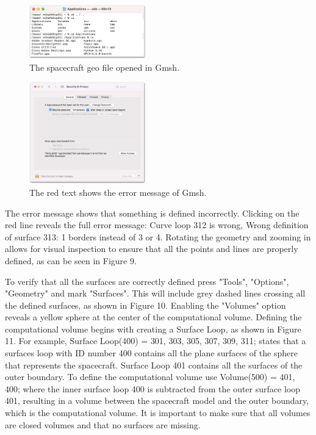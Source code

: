 \documentclass[a4paper, 11pt]{article}
\begin{document}
\begin{figure}[!ht]
    \centering
    \includegraphics[width=0.45\textwidth]{fig7.jpg}
    \caption{The spacecraft geo file opened in Gmsh.}
\end{figure}

\begin{figure}[!ht]
    \centering
    \includegraphics[width=0.45\textwidth]{fig8.jpg}
    \caption{The red text shows the error message of Gmsh.}
\end{figure}

The error message shows that something is defined incorrectly. Clicking on the red line reveals the full error message: Curve loop 312 is wrong, Wrong definition of surface 313: 1 borders instead of 3 or 4. Rotating the geometry and zooming in allows for visual inspection to ensure that all the points and lines are properly defined, as can be seen in Figure 9.\par
To verify that all the surfaces are correctly defined press "Tools", "Options", "Geometry" and mark "Surfaces". This will include grey dashed lines crossing all the defined surfaces, as shown in Figure 10. Enabling the "Volumes" option reveals a yellow sphere at the center of the computational volume. Defining the computational volume begins with creating a Surface Loop, as shown in Figure 11. For example, Surface Loop(400) = {301, 303, 305, 307, 309, 311}; states that a surfaces loop with ID number 400 contains all the plane surfaces of the sphere that represents the spacecraft. Surface Loop 401 contains all the surfaces of the outer boundary. To define the computational volume use Volume(500) = {401, 400}; where the inner surface loop 400 is subtracted from the outer surface loop 401, resulting in a volume between the spacecraft model and the outer boundary, which is the computational volume. It is important to make sure that all volumes are closed volumes and that no surfaces are missing.
\end{document}
